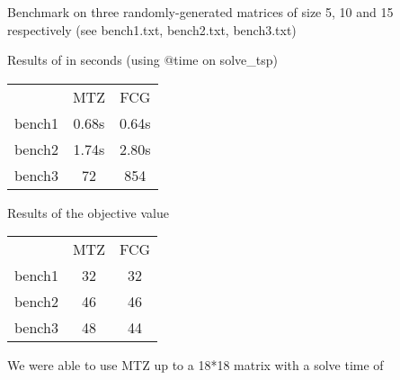 Benchmark on three randomly-generated matrices of size 5, 10 and 15 respectively\newline
(see bench1.txt, bench2.txt, bench3.txt)

\bigbreak
Results of in seconds (using @time on solve\_tsp)\newline
\begin{tabular}{|c|c|c|}
\ & MTZ & FCG \\
bench1 & 0.68s & 0.64s \\
bench2 & 1.74s & 2.80s \\
bench3 & 72 & 854 \\
\end{tabular}

\bigbreak

Results of the objective value\newline
\begin{tabular}{|c|c|c|}
\ & MTZ & FCG \\
bench1 & 32 & 32 \\
bench2 & 46 & 46 \\
bench3 & 48 & 44 \\
\end{tabular}
\bigbreak
We were able to use MTZ up to a 18*18 matrix with a solve time of

